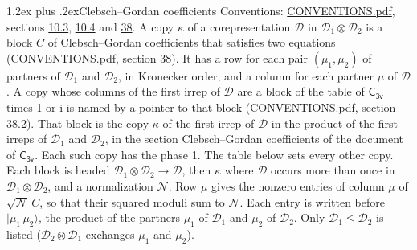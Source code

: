 \documentclass[10pt,a4paper]{article}
\makeatletter
\renewcommand\section{\@startsection{section}{1}{\z@}{-3ex plus -1ex minus -.2ex}%
  {1.2ex plus .2ex}{\normalfont\large\sffamily\bfseries\color{parttitle}}}
\numberwithin{equation}{section}
\newcommand{\grp}[1]{\mathsf{#1}}
\newcommand{\iunit}{\mathrm{i}}
\newcommand{\irrprod}{\otimes}
\newcommand{\mult}{\kappa}
\newcommand{\intx}{\mu}
\newcommand{\cgnorm}{\mathcal{N}}
\newcommand{\prodket}[2]{\lvert {#1}\,{#2}\rangle}
\makeatother
\begin{document}
\section{Clebsch--Gordan coefficients}\label{s:clebsch_gordan}
Conventions: \href{../../CONVENTIONS.pdf}{CONVENTIONS.pdf}, sections \href{../../../rotation/CONVENTIONS.pdf\#conv.10.3}{10.3}, \href{../../../rotation/CONVENTIONS.pdf\#conv.10.4}{10.4} and \href{../../CONVENTIONS.pdf\#conv.38}{38}.
\leavevmode\label{n:index.copy}\label{n:matrix.cg.stored}A copy $\mult$ of a corepresentation $\mathcal{D}$ in $\mathcal{D}_1\irrprod\mathcal{D}_2$ is a block $C$ of Clebsch--Gordan coefficients that satisfies two equations (\href{../../CONVENTIONS.pdf}{CONVENTIONS.pdf}, section \href{../../CONVENTIONS.pdf\#conv.38}{38}). \label{n:index.cg}It has a row for each pair $(\intx_1, \intx_2)$ of partners of $\mathcal{D}_1$ and $\mathcal{D}_2$, in Kronecker order, and a column for each partner $\intx$ of $\mathcal{D}$.
A copy whose columns of the first irrep of $\mathcal{D}$ are a block of the table of $\grp{C_{3v}}$ times 1 or $\iunit$ is named by a pointer to that block (\href{../../CONVENTIONS.pdf}{CONVENTIONS.pdf}, section \href{../../CONVENTIONS.pdf\#conv.38.2}{38.2}). That block is the copy $\mult$ of the first irrep of $\mathcal{D}$ in the product of the first irreps of $\mathcal{D}_1$ and $\mathcal{D}_2$, in the section Clebsch--Gordan coefficients of the document of \href{../../../rotation/data/pdf/C3v.pdf}{$\grp{C_{3v}}$}. Each such copy has the phase 1. The table below sets every other copy.
Each block is headed $\mathcal{D}_1\irrprod\mathcal{D}_2\to\mathcal{D}$, then $\mult$ where $\mathcal{D}$ occurs more than once in $\mathcal{D}_1\irrprod\mathcal{D}_2$, and a normalization $\cgnorm$. Row $\intx$ gives the nonzero entries of column $\intx$ of $\sqrt{\cgnorm}\,C$, so that their squared moduli sum to $\cgnorm$. \label{n:vector.ket.product}Each entry is written before $\prodket{\intx_1}{\intx_2}$, the product of the partners $\intx_1$ of $\mathcal{D}_1$ and $\intx_2$ of $\mathcal{D}_2$. Only $\mathcal{D}_1 \le \mathcal{D}_2$ is listed ($\mathcal{D}_2\irrprod\mathcal{D}_1$ exchanges $\intx_1$ and $\intx_2$).
\end{document}
